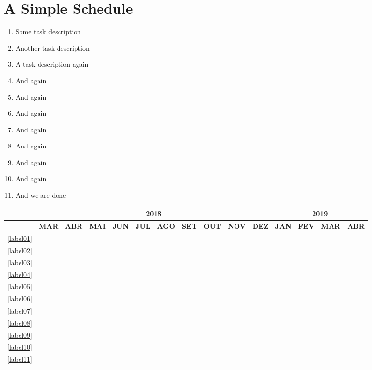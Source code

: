 \documentclass{article}
\begin{document}
\section{A Simple Schedule}

\begin{enumerate}
	\item \label{label01} Some task description
	\item \label{label02} Another task description
	\item \label{label03} A task description again
	\item \label{label04} And again
	\item \label{label05} And again
	\item \label{label06} And again
	\item \label{label07} And again
	\item \label{label08} And again
	\item \label{label09} And again
	\item \label{label10} And again
	\item \label{label11} And we are done
\end{enumerate}




\begin{table}[!htbp]
	\centering
		\begin{tabular}{|c||c|c|c|c|c|c|c|c|c|c|c|c|c|c|}
		\hline
		&\multicolumn{10}{c|}{2018}&\multicolumn{4}{c|}{2019}\\
		\hline
		&\tiny{\textbf{MAR}}&\tiny{\textbf{ABR}}&\tiny{\textbf{MAI}}&\tiny{\textbf{JUN}}&\tiny{\textbf{JUL}}&\tiny{\textbf{AGO}}&\tiny{\textbf{SET}}&\tiny{\textbf{OUT}}&\tiny{\textbf{NOV}}&\tiny{\textbf{DEZ}}&\tiny{\textbf{JAN}}&\tiny{\textbf{FEV}}&\tiny{\textbf{MAR}}&\tiny{\textbf{ABR}}\\
		\hline \hline
		\ref{label01} &\X&&&&&&&&&&&&&\\
		\hline
		\ref{label02}&&\X&\X&\X&\X&&&&&&&&&\\
		\hline	
		\ref{label03}&\X&\X&\X&&&&&&&&&&&\\
		\hline			
		\ref{label04}&&&\X&\X&&&&&&&&&&\\
		\hline
		\ref{label05}&&&&\X&\X&&&&&&&&&\\
		\hline	
		\ref{label06}&&&&\X&\X&&&&&&&&&\\
		\hline	
		\ref{label07}&&&&&\X&\X&\X&\X&&&&&&\\
		\hline	
		\ref{label08}&&&&&&&&\X&\X&\X&&&&\\
		\hline	
		\ref{label09}&&&&&&&&&&\X&\X&\X&&\\
		\hline	
		\ref{label10}&&&&&&&&&&\X&\X&\X&\X&\\
		\hline
		\ref{label11}&&&&&&&&&&&&&&\X\\
		\hline	
		\end{tabular}
\end{table}
\end{document}
